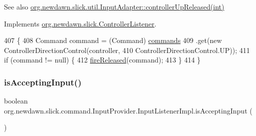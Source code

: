 \begin{DoxySeeAlso}{See also}
\mbox{\hyperlink{classorg_1_1newdawn_1_1slick_1_1util_1_1_input_adapter_a78fed236d44ced5cc4fc1b1c093f50fb}{org.\+newdawn.\+slick.\+util.\+Input\+Adapter\+::controller\+Up\+Released(int)}} 
\end{DoxySeeAlso}


Implements \mbox{\hyperlink{interfaceorg_1_1newdawn_1_1slick_1_1_controller_listener_a1342ad9ad1f7314b4eb10c20c21a9d50}{org.\+newdawn.\+slick.\+Controller\+Listener}}.


\begin{DoxyCode}
407                                                          \{
408             Command command = (Command) \mbox{\hyperlink{classorg_1_1newdawn_1_1slick_1_1command_1_1_input_provider_ab2bd0c08506a59bc7457d7a87cf873d2}{commands}}
409                     .\textcolor{keyword}{get}(\textcolor{keyword}{new} ControllerDirectionControl(controller,
410                             ControllerDirectionControl.UP));
411             \textcolor{keywordflow}{if} (command != null) \{
412                 \mbox{\hyperlink{classorg_1_1newdawn_1_1slick_1_1command_1_1_input_provider_afede03e3ab95cb0248635cf64de6874c}{fireReleased}}(command);
413             \}
414         \}
\end{DoxyCode}
\mbox{\label{classorg_1_1newdawn_1_1slick_1_1command_1_1_input_provider_1_1_input_listener_impl_aafacc541954726a57251f0893750a9e4}} 
\subsubsection{\texorpdfstring{is\+Accepting\+Input()}{isAcceptingInput()}}
{\footnotesize\ttfamily boolean org.\+newdawn.\+slick.\+command.\+Input\+Provider.\+Input\+Listener\+Impl.\+is\+Accepting\+Input (\begin{DoxyParamCaption}{ }\end{DoxyParamCaption})\hspace{0.3cm}{\ttfamily [inline]}}

